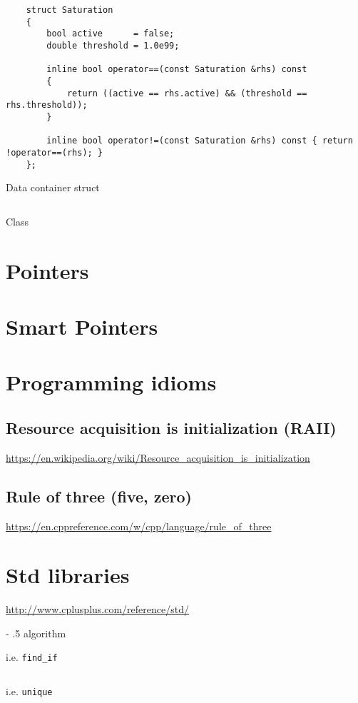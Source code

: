 \documentclass[
10pt,
a4paper,
parskip=half,	%
DIV=0,			%
BCOR=10mm
]{scrartcl}
\makeatletter
\renewcommand\paragraph{%
	\@startsection{paragraph}{4}{0mm}%
	{-\baselineskip}%
	{.5\baselineskip}%
	{\normalfont\normalsize\bfseries}}
\newcommand{\ttt}[1]{\texttt{#1}}
\makeatother
\begin{document}
\begin{listing}[htbp]
	\begin{verbatim}
	struct Saturation
	{
		bool active      = false;
		double threshold = 1.0e99;
		
		inline bool operator==(const Saturation &rhs) const
		{
			return ((active == rhs.active) && (threshold == rhs.threshold));
		}
		
		inline bool operator!=(const Saturation &rhs) const { return !operator==(rhs); }
	};
	\end{verbatim}
	\caption{Data container struct}
\end{listing}

\begin{listing}[htbp]
	\inputminted{cpp}{src/classes-structs/ReceiverPath.h}
	\caption{Class}
\end{listing}
	
\pagebreak
\section{Pointers}

	
\section{Smart Pointers}
	
\section{Programming idioms} 
\label{sec:programming-idioms}
	\subsection{Resource acquisition is initialization (RAII)}
	
	\url{https://en.wikipedia.org/wiki/Resource_acquisition_is_initialization}
	
	\subsection{Rule of three (five, zero)}
	\label{subsec:rule-of-three}
	
	\url{https://en.cppreference.com/w/cpp/language/rule_of_three}
	

\section{Std libraries}
	
	\url{http://www.cplusplus.com/reference/std/}
	
	\paragraph{algorithm}
	
	i.e. \ttt{find\_if}
	\inputminted{cpp}{src/algorithm/ex-1/main.cpp}
	
	i.e. \ttt{unique}
	\inputminted{cpp}{src/algorithm/ex-2/main.cpp}
	
\end{document}
